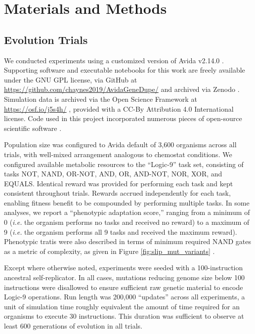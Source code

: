 \section{Materials and Methods} \label{sec:methods}

\subsection{Evolution Trials}

We conducted experiments using a customized version of Avida v2.14.0 \citep{Ofria:2009avida}.
Supporting software and executable notebooks for this work are freely available under the GNU GPL license, via GitHub at \url{https://github.com/chaynes2019/AvidaGeneDupe/} and archived via Zenodo \citep{haynes_2025,https://doi.org/10.25495/7gxk-rd71}.
Simulation data is archived via the Open Science Framework at \url{https://osf.io/j5s4h/} \citep{Moreno_Haynes_2025,foster2017open}, provided with a CC-By Attribution 4.0 International license.
Code used in this project incorporated numerous pieces of open-source scientific software \citep{2020SciPy-NMeth,harris2020array,reback2020pandas,mckinney-proc-scipy-2010,waskom2021seaborn,hunter2007matplotlib,moreno2023teeplot,r_core_team_r:_2015}.

Population size was configured to Avida default of 3,600 organisms across all trials, with well-mixed arrangement analogous to chemostat conditions.
We configured available metabolic resources to the ``Logic-9'' task set, consisting of tasks NOT, NAND, OR-NOT, AND, OR, AND-NOT, NOR, XOR, and EQUALS.
Identical reward was provided for performing each task and kept consistent throughout trials.
Rewards accrued independently for each task, enabling fitness benefit to be compounded by performing multiple tasks.
In some analyses, we report a ``phenotypic adaptation score,'' ranging from a minimum of 0 (\textit{i.e.} the organism performs no tasks and received no reward) to a maximum of 9 (\textit{i.e.} the organism performs all 9 tasks and received the maximum reward).
Phenotypic tratis were also described in terms of minimum required NAND gates as a metric of complexity, as given in Figure \ref{fig:slip_mut_variants} \citep{lenski2003evolutionary}.

Except where otherwise noted, experiments were seeded with a 100-instruction ancestral self-replicator.
In all cases, mutations reducing genome size below 100 instructions were disallowed to ensure sufficient raw genetic material to encode Logic-9 operations.
Run length was 200,000 ``updates'' across all experiments, a unit of simulation time roughly equivalent the amount of time required for an organisms to execute 30 instructions.
This duration was sufficient to observe at least 600 generations of evolution in all trials.


